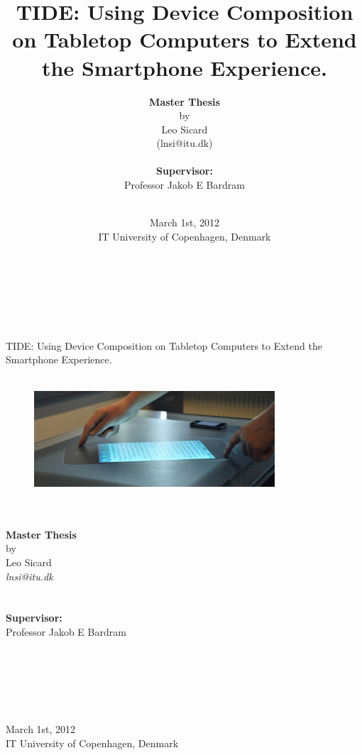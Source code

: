 \documentclass[a4paper,11pt,twoside,onecolumn,openright]{memoir}
\title{\Huge TIDE: Using Device Composition on Tabletop Computers to Extend the Smartphone Experience.}
\author{\textbf{Master Thesis}\\by\\Leo Sicard\\(lnsi@itu.dk)\\
\\
\textbf{Supervisor:}\\Professor Jakob E Bardram\\
\\}
\date{March 1st, 2012\\IT University of Copenhagen, Denmark}
\begin{document}

\pagestyle{empty}

\begin{centering}
\hfill\\
\hfill\\
\hfill\\
\hfill\\

\Huge TIDE: Using Device Composition on Tabletop Computers to Extend the Smartphone Experience.
\hfill\\
\hfill\\
\begin{figure}[h!]
  \centering
    \includegraphics[width=0.8\textwidth]{images/tide314}
\end{figure}
\large
\hfill\\
\hfill\\
\textbf{Master Thesis}\\by\\Leo Sicard\\
\emph{lnsi@itu.dk}\\
\hfill\\
\hfill\\
\textbf{Supervisor:}\\Professor Jakob E Bardram\\
\hfill\\
\hfill\\
\hfill\\
\hfill\\
\hfill\\
\hfill\\
March 1st, 2012\\IT University of Copenhagen, Denmark\\
\end{centering}
\clearpage
\end{document}
